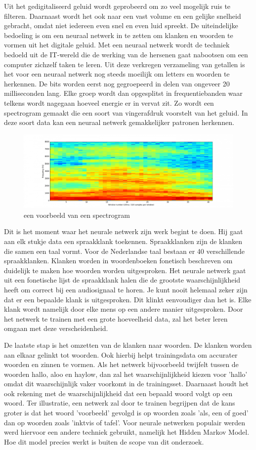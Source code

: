 Uit het gedigitaliseerd geluid wordt geprobeerd om zo veel mogelijk ruis te filteren. Daarnaast wordt het ook naar een vast volume en een gelijke snelheid gebracht, omdat niet iedereen even snel en even luid spreekt. De uiteindelijke bedoeling is om een neuraal netwerk in te zetten om klanken en woorden te vormen uit het digitale geluid. Met een neuraal netwerk wordt de techniek bedoeld uit de IT-wereld die de werking van de hersenen gaat nabootsen om een computer zichzelf taken te leren.
Uit deze verkregen verzameling van getallen is het voor een neuraal netwerk nog steeds moeilijk om letters en woorden te herkennen. De bits worden eerst nog gegroepeerd in delen van ongeveer 20 milliseconden lang. Elke groep wordt dan opgesplitst in frequentiebanden waar telkens wordt nagegaan hoeveel energie er in vervat zit. Zo wordt een spectrogram gemaakt die een soort van vingerafdruk voorstelt van het geluid. In deze soort data kan een neuraal netwerk gemakkelijker patronen herkennen.
\begin{figure}[h]
    \includegraphics[width=0.7\linewidth]{img/spectogram}
    \caption{een voorbeeld van een spectrogram \autocite{Vervoort2017}}
    \label{fig:spectrogram}
\end{figure}
Dit is het moment waar het neurale netwerk zijn werk begint te doen. Hij gaat aan elk stukje data een spraakklank toekennen. Spraakklanken zijn de klanken die samen een taal vormt. Voor de Nederlandse taal bestaan er 40 verschillende spraakklanken. Klanken worden in woordenboeken fonetisch beschreven om duidelijk te maken hoe woorden worden uitgesproken. Het neurale netwerk gaat uit een fonetische lijst de spraakklank halen die de grootste waarschijnlijkheid heeft om correct bij een audiosignaal te horen. Je kunt nooit helemaal zeker zijn dat er een bepaalde klank is uitgesproken. Dit klinkt eenvoudiger dan het is. Elke klank wordt namelijk door elke mens op een andere manier uitgesproken. Door het netwerk te trainen met een grote hoeveelheid data, zal het beter leren omgaan met deze verscheidenheid.

De laatste stap is het omzetten van de klanken naar woorden. De klanken worden aan elkaar gelinkt tot woorden. Ook hierbij helpt trainingsdata om accurater woorden en zinnen te vormen. Als het netwerk bijvoorbeeld twijfelt tussen de woorden hallo, aloo en haylow, dan zal het waarschijnlijkheid kiezen voor 'hallo' omdat dit waarschijnlijk vaker voorkomt in de trainingsset. Daarnaast houdt het ook rekening met de waarschijnlijkheid dat een bepaald woord volgt op een woord. Ter illustratie, een netwerk zal door te trainen begrijpen dat de kans groter is dat het woord 'voorbeeld' gevolgd is op woorden zoals 'als, een of goed' dan op woorden zoals 'inktvis of tafel'. Voor neurale netwerken populair werden werd hiervoor een andere techniek gebruikt, namelijk het Hidden Markov Model. Hoe dit model precies werkt is buiten de scope van dit onderzoek.

